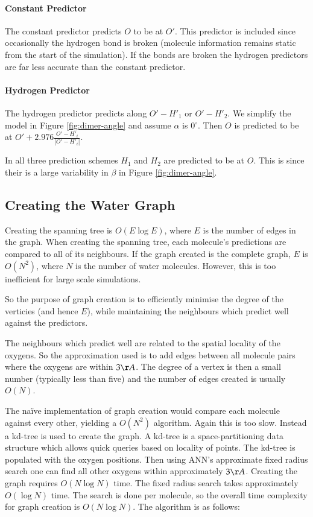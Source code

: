 \documentclass[a4paper]{report}
\newcommand{\degree}{\ensuremath{^\circ}}
\begin{document}
\paragraph{Constant Predictor}
The constant predictor predicts $O$ to be at $O'$. This predictor is included
since occasionally the hydrogen bond is broken (molecule information remains
static from the start of the simulation). If the bonds are broken the hydrogen
predictors are far less accurate than the constant predictor.

\paragraph{Hydrogen Predictor}
The hydrogen predictor predicts along $O'-H'_1$ or $O'-H'_2$. We simplify the
model in Figure \ref{fig:dimer-angle} and assume $\alpha$ is $0\degree$. Then
$O$ is predicted to be at $O' + 2.976\frac{O'-H'_i}{|O'-H'_i|}$.

In all three prediction schemes $H_1$ and $H_2$ are predicted to be at
$O$. This is since their is a large variability in $\beta$ in Figure
\ref{fig:dimer-angle}.


\subsection{Creating the Water Graph}

Creating the spanning tree is $O(E \log E)$, where $E$ is the number of edges
in the graph. When creating the spanning tree, each molecule's predictions are
compared to all of its neighbours. If the graph created is the complete graph,
$E$ is $O(N^2)$, where $N$ is the number of water molecules. However, this is
too inefficient for large scale simulations.

So the purpose of graph creation is to efficiently minimise the degree of the
verticies (and hence $E$), while maintaining the neighbours which predict well
against the predictors.

The neighbours which predict well are related to the spatial locality of the
oxygens. So the approximation used is to add edges between all molecule pairs
where the oxygens are within $3\AA$. The degree of a vertex is then a small
number (typically less than five) and the number of edges created is usually
$O(N)$.

The na\"{i}ve implementation of graph creation would compare each molecule
against every other, yielding a $O(N^2)$ algorithm. Again this is too
slow. Instead a kd-tree \citep{cormen2001introduction} is used to create the
graph. A kd-tree is a space-partitioning data structure which allows quick
queries based on locality of points. The kd-tree is populated with the oxygen
positions. Then using ANN's approximate fixed radius search one can find all
other oxygens within approximately $3\AA$. Creating the graph requires $O(N
\log N)$ time. The fixed radius search takes approximately $O(\log N)$
time. The search is done per molecule, so the overall time complexity for
graph creation is $O(N \log N)$. The algorithm is as follows:
\end{document}
